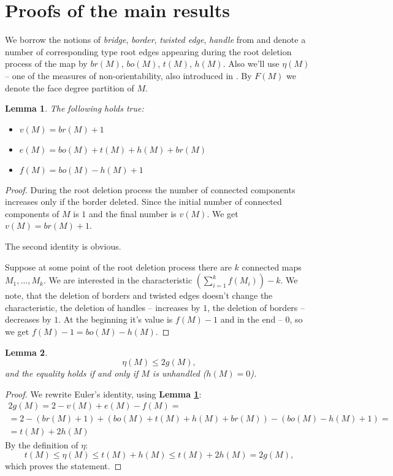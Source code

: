 \documentclass{article}
\newtheorem{lemma}{Lemma}
\begin{document}
\section{Proofs of the main results}

We borrow the notions of \emph{bridge}, \emph{border}, \emph{twisted edge}, \emph{handle} from \cite{dolega} and denote a number of corresponding type root edges appearing during the root deletion process of the map by $br(M)$, $bo(M)$, $t(M)$, $h(M)$. Also we'll use $\eta(M)$ -- one of the measures of non-orientability, also introduced in \cite{dolega}. By $F(M)$ we denote the face degree partition of $M$.

\begin{lemma}\label{lemma:map_char_identitites} The following holds true:
    \begin{itemize}
        \item $v(M) = br(M) + 1$
        \item $e(M) = bo(M) + t(M) + h(M) + br(M)$
        \item $f(M) = bo(M) - h(M) + 1$
    \end{itemize}
\end{lemma}
\begin{proof}
    During the root deletion process the number of connected components increases only if the border deleted. Since the initial number of connected components of $M$ is $1$ and the final number is $v(M)$. We get $v(M) = br(M) + 1$.

    The second identity is obvious.

    Suppose at some point of the root deletion process there are $k$ connected maps $M_1, \ldots, M_k$. We are interested in the characteristic $\left(\sum\limits_{i = 1}^{k}f(M_i)\right) - k$. We note, that the deletion of borders and twisted edges doesn't change the characteristic, the deletion of handles -- increases  by $1$, the deletion of borders -- decreases by $1$. At the beginning it's value is $f(M) - 1$ and in the end -- $0$, so we get $f(M) - 1 = bo(M) - h(M)$.
\end{proof}

\begin{lemma}\label{lemma:eta_bound}
    $$
        \eta(M) \leq 2g(M),
    $$
    and the equality holds if and only if $M$ is unhandled ($h(M) = 0$).
\end{lemma}

\begin{proof}
    We rewrite Euler's identity, using \textbf{Lemma \ref{lemma:map_char_identitites}}:
    \begin{multline*}
        2g(M) = 2 - v(M) + e(M) - f(M) = \\ = 2 - (br(M) + 1) + (bo(M) + t(M) + h(M) + br(M)) - (bo(M) - h(M) + 1) = \\ = t(M) + 2h(M)
    \end{multline*}
    By the definition of $\eta$:
    $$
        t(M) \leq \eta(M) \leq t(M) + h(M) \leq t(M) + 2h(M) = 2g(M),
    $$
    which proves the statement.
\end{proof}
\end{document}
